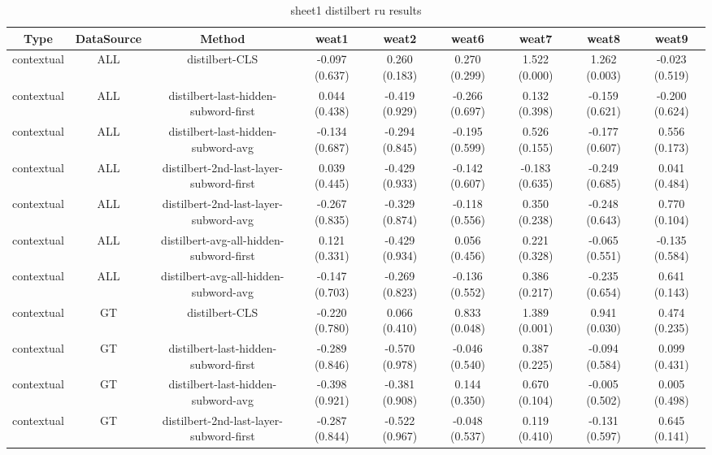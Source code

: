 \begin{sidewaystable}[htb]
    \centering
    \caption{sheet1 distilbert ru results}
    \label{appendix_tab:sheet1_distilbert_ru_results}
    \small
    \begin{tabular}{@{}ccccccccc@{}}
        \toprule
        Type & DataSource & Method & weat1 & weat2 & weat6 & weat7 & weat8 & weat9 \\
        \midrule
        contextual & ALL & distilbert-CLS & -0.097 (0.637) & 0.260 (0.183) & 0.270 (0.299) & 1.522 (0.000) & 1.262 (0.003) & -0.023 (0.519) \\
        contextual & ALL & distilbert-last-hidden-subword-first & 0.044 (0.438) & -0.419 (0.929) & -0.266 (0.697) & 0.132 (0.398) & -0.159 (0.621) & -0.200 (0.624) \\
        contextual & ALL & distilbert-last-hidden-subword-avg & -0.134 (0.687) & -0.294 (0.845) & -0.195 (0.599) & 0.526 (0.155) & -0.177 (0.607) & 0.556 (0.173) \\
        contextual & ALL & distilbert-2nd-last-layer-subword-first & 0.039 (0.445) & -0.429 (0.933) & -0.142 (0.607) & -0.183 (0.635) & -0.249 (0.685) & 0.041 (0.484) \\
        contextual & ALL & distilbert-2nd-last-layer-subword-avg & -0.267 (0.835) & -0.329 (0.874) & -0.118 (0.556) & 0.350 (0.238) & -0.248 (0.643) & 0.770 (0.104) \\
        contextual & ALL & distilbert-avg-all-hidden-subword-first & 0.121 (0.331) & -0.429 (0.934) & 0.056 (0.456) & 0.221 (0.328) & -0.065 (0.551) & -0.135 (0.584) \\
        contextual & ALL & distilbert-avg-all-hidden-subword-avg & -0.147 (0.703) & -0.269 (0.823) & -0.136 (0.552) & 0.386 (0.217) & -0.235 (0.654) & 0.641 (0.143) \\
        contextual & GT & distilbert-CLS & -0.220 (0.780) & 0.066 (0.410) & 0.833 (0.048) & 1.389 (0.001) & 0.941 (0.030) & 0.474 (0.235) \\
        contextual & GT & distilbert-last-hidden-subword-first & -0.289 (0.846) & -0.570 (0.978) & -0.046 (0.540) & 0.387 (0.225) & -0.094 (0.584) & 0.099 (0.431) \\
        contextual & GT & distilbert-last-hidden-subword-avg & -0.398 (0.921) & -0.381 (0.908) & 0.144 (0.350) & 0.670 (0.104) & -0.005 (0.502) & 0.005 (0.498) \\
        contextual & GT & distilbert-2nd-last-layer-subword-first & -0.287 (0.844) & -0.522 (0.967) & -0.048 (0.537) & 0.119 (0.410) & -0.131 (0.597) & 0.645 (0.141) \\

\end{tabular}
\end{sidewaystable}

